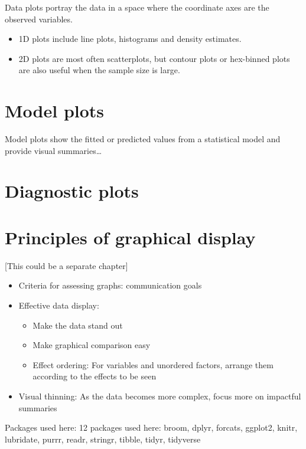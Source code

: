 \documentclass[
  letterpaper,
  10pt,
  krantz2]{krantz}
\providecommand{\tightlist}{%
  \setlength{\itemsep}{0pt}\setlength{\parskip}{0pt}}\usepackage{longtable,booktabs,array}
\begin{document}
Data plots portray the data in a space where the coordinate axes are the
observed variables.

\begin{itemize}
\tightlist
\item
  1D plots include line plots, histograms and density estimates.
\item
  2D plots are most often scatterplots, but contour plots or hex-binned
  plots are also useful when the sample size is large.
\end{itemize}

\section{Model plots}\label{model-plots}

Model plots show the fitted or predicted values from a statistical model
and provide visual summaries\ldots{}

\section{Diagnostic plots}\label{diagnostic-plots}

\section{Principles of graphical
display}\label{principles-of-graphical-display}

{[}This could be a separate chapter{]}

\begin{itemize}
\tightlist
\item
  Criteria for assessing graphs: communication goals
\item
  Effective data display:

  \begin{itemize}
  \tightlist
  \item
    Make the data stand out
  \item
    Make graphical comparison easy
  \item
    Effect ordering: For variables and unordered factors, arrange them
    according to the effects to be seen
  \end{itemize}
\item
  Visual thinning: As the data becomes more complex, focus more on
  impactful summaries
\end{itemize}

Packages used here: 12 packages used here: broom, dplyr, forcats,
ggplot2, knitr, lubridate, purrr, readr, stringr, tibble, tidyr,
tidyverse
\end{document}
